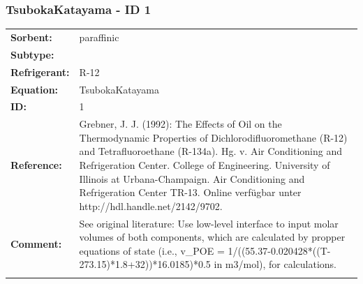 \subsubsection{TsubokaKatayama - ID 1}
%
\begin{tabular}[l]{|lp{11.5cm}|}
\hline
\addlinespace

\textbf{Sorbent:} & paraffinic \\
\textbf{Subtype:} &  \\
\textbf{Refrigerant:} & R-12 \\
\textbf{Equation:} & TsubokaKatayama \\
\textbf{ID:} & 1 \\
\textbf{Reference:} & Grebner, J. J. (1992): The Effects of Oil on the Thermodynamic Properties of Dichlorodifluoromethane (R-12) and Tetrafluoroethane (R-134a). Hg. v. Air Conditioning and Refrigeration Center. College of Engineering. University of Illinois at Urbana-Champaign. Air Conditioning and Refrigeration Center TR-13. Online verfügbar unter http://hdl.handle.net/2142/9702. \\
\textbf{Comment:} & See original literature: Use low-level interface to input molar volumes of both components, which are calculated by propper equations of state (i.e., v\_POE =  1/((55.37-0.020428*((T-273.15)*1.8+32))*16.0185)*0.5 in m3/mol), for calculations. \\

\addlinespace
\hline
\end{tabular}
\newline

